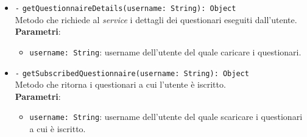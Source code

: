 \begin{itemize}
\begin{itemize}
		\item \texttt{-} \texttt{getQuestionnaireDetails(username: String): Object} \\ Metodo che richiede al \textit{service} i dettagli dei questionari eseguiti dall'utente. \\
		\textbf{Parametri}:
		\begin{itemize}
			\item \texttt{username: String}: username dell'utente del quale caricare i questionari.
		\end{itemize}
		\item \texttt{-} \texttt{getSubscribedQuestionnaire(username: String): Object} \\Metodo che ritorna i questionari a cui l'utente è iscritto. \\
		\textbf{Parametri}:
		\begin{itemize}
			\item \texttt{username: String}: username dell'utente del quale scaricare i questionari a cui è iscritto.
		\end{itemize}
	\end{itemize}
\end{itemize}

